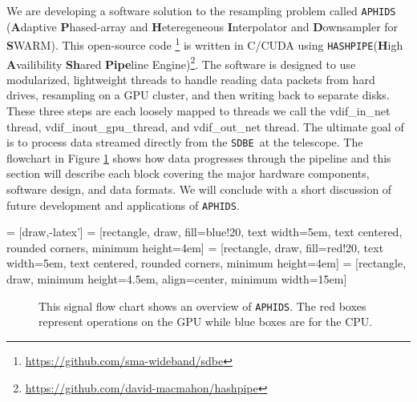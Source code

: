 \documentclass[11pt,preprint]{aastex}
\newcommand{\SDBE}{\texttt{SDBE}}
\newcommand{\APHIDS}{\texttt{APHIDS}}
\newcommand{\HASHPIPE}{\texttt{HASHPIPE}}
\begin{document}
We are developing a software solution to the resampling problem called \APHIDS\, (\textbf{A}daptive 
\textbf{P}hased-array and 
\textbf{H}eteregeneous \textbf{I}nterpolator and \textbf{D}ownsampler for \textbf{S}WARM).  This open-source 
code \footnote{\url{https://github.com/sma-wideband/sdbe}} is written in C/CUDA using
\HASHPIPE (\textbf{H}igh \textbf{A}vailibility \textbf{Sh}ared \textbf{Pipe}line
 Engine)\footnote{\url{https://github.com/david-macmahon/hashpipe}}.  The software is designed to use 
modularized, lightweight threads to handle reading data packets from hard drives, resampling on a GPU cluster, 
and then writing back to separate disks.  These three steps are each loosely mapped to threads we call the 
vdif\_in\_net thread, vdif\_inout\_gpu\_thread, and vdif\_out\_net thread. 
The ultimate goal of is to process data streamed directly from the 
\SDBE\, at the telescope.  The flowchart in Figure \ref{fig:aphids_flow_chart} shows how data progresses 
through the pipeline and this section will describe each block covering the major hardware components, software 
design, and data formats.  We will conclude with a short discussion of future development and applications of \APHIDS.

 = [draw,-latex']
 = [rectangle, draw, fill=blue!20,
    text width=5em, text centered, rounded corners, minimum height=4em]
 = [rectangle, draw, fill=red!20,
    text width=5em, text centered, rounded corners, minimum height=4em]
 = [rectangle, draw, minimum height=4.5em, align=center, minimum width=15em] 

\begin{figure}[H]
\begin{center}
\label{fig:aphids_flow_chart}
\caption{This signal flow chart shows an overview of \APHIDS.  The red boxes represent operations on the GPU while blue boxes are for the CPU.}
\end{center}
\end{figure}
\end{document}

